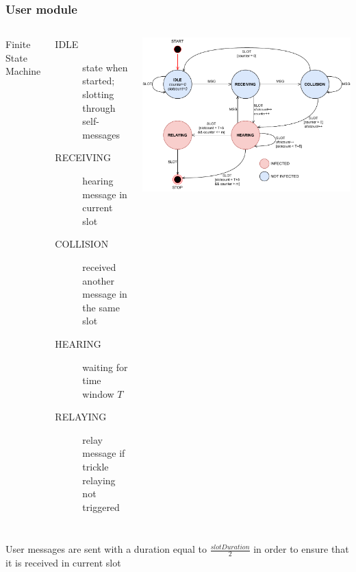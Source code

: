 \documentclass{beamer}
\begin{document}
\begin{frame}
	\frametitle{User module}
	\begin{columns}
		Finite State Machine
		\begin{description}
			\item[IDLE] state when started; slotting through
				self-messages
			\item[RECEIVING] hearing message in current slot
			\item[COLLISION] received another message in the same
				slot
			\item[HEARING] waiting for time window \(T\)
			\item[RELAYING] relay message if trickle relaying not
				triggered
		\end{description}
		\includegraphics[width=\textwidth]{img/userfsm}
	\end{columns}
	User messages are sent with a duration equal to
	\(\frac{slotDuration}{2}\) in order to ensure that it is
	received in current slot
\end{frame}
\end{document}
